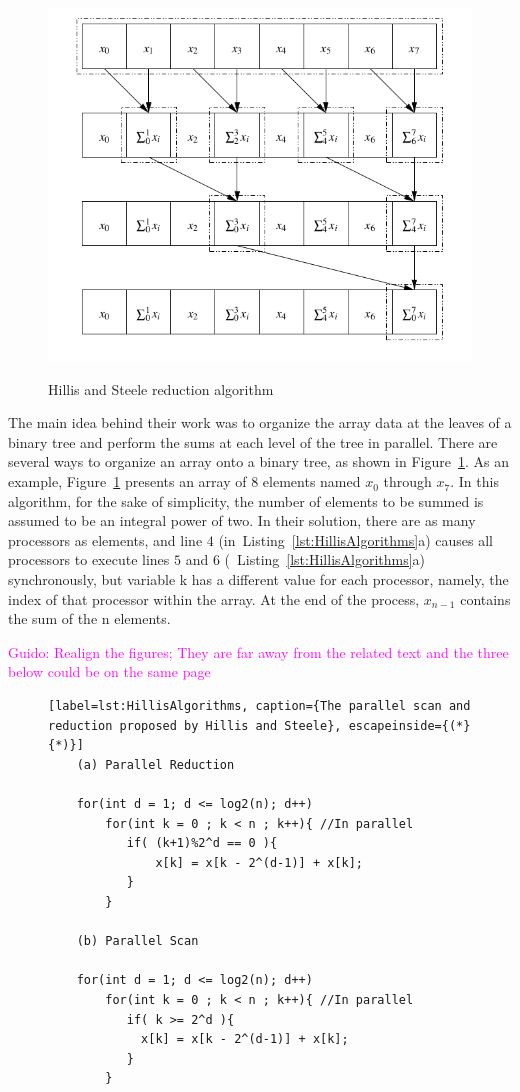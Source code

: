 \documentclass[Ingles]{ic-tese-v1}
\newcommand{\guido}[1]{\noindent\textcolor{magenta}{Guido: {#1}}}
\newcommand{\guido}[1]{}
\newcommand{\rfig}[1]{Figure~\ref{fig:#1}}
\newcommand{\rlsts}[2]{Listing~\ref{lst:#1}{#2}}
\begin{document}
	\begin{figure}[h]
		\centering
		\caption{Hillis and Steele reduction algorithm}
		\includegraphics[scale=0.5]{images/reduction.png}
		\label{fig:reductionhillis}
	\end{figure}
	 The main idea behind their work was to organize the array data at the leaves of a
binary tree and perform the sums at each level of the tree in parallel. There are several ways to organize an array onto a binary tree, as shown in  \rfig{reductionhillis}. As an example, \rfig{reductionhillis} presents an array of 8 elements named $x_{0}$ through $x_{7}$. In this algorithm, for the sake of simplicity, the number of elements to be summed is assumed to be an integral power of two. In their solution, there are as many processors as elements, and line $4$ (in~\rlsts{HillisAlgorithms}{a}) causes all processors to execute lines $5$ and $6$ (~\rlsts{HillisAlgorithms}{a}) synchronously, but variable k has a different value for each processor, namely, the index of that processor within the array. At the end of the process, $x_{n-1}$ contains the sum of the n elements.

\guido{Realign the figures; They are far away from the related text and the three below could be on the same page}

\begin{figure}[t]
	\lstset{basicstyle=\scriptsize}
	\begin{lstlisting}[label=lst:HillisAlgorithms, caption={The parallel scan and reduction proposed by Hillis and Steele}, escapeinside={(*}{*)}]
	(a) Parallel Reduction
	
	for(int d = 1; d <= log2(n); d++)
	    for(int k = 0 ; k < n ; k++){ //In parallel
	       if( (k+1)%2^d == 0 ){
	           x[k] = x[k - 2^(d-1)] + x[k];
	       }
	    }
	
	(b) Parallel Scan
	
	for(int d = 1; d <= log2(n); d++)
	    for(int k = 0 ; k < n ; k++){ //In parallel
	       if( k >= 2^d ){
	         x[k] = x[k - 2^(d-1)] + x[k];
	       }
	    }
	
	\end{lstlisting}
\end{figure}
\end{document}
